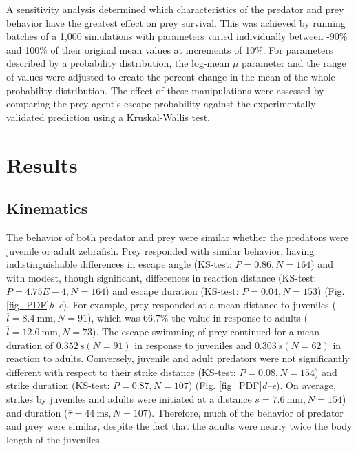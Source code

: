 \documentclass[]{rsos}%
\begin{document}
A sensitivity analysis determined which characteristics of the predator and prey behavior have the greatest effect on prey survival. 
This was achieved by running batches of a 1,000 simulations with parameters varied individually between -90\% and 100\% of their original mean values at increments of 10\%.
For parameters described by a probability distribution, the log-mean $\mu$ parameter and the range of values were adjusted to create the percent change in the mean of the whole probability distribution.
The effect of these manipulations were assessed by comparing the prey agent's escape probability against the experimentally-validated prediction using a Kruskal-Wallis test. 



\section{Results} %

\subsection{Kinematics} %
The behavior of both predator and prey were similar whether the predators were juvenile or adult zebrafish.
Prey responded with similar behavior, having indistinguishable differences in escape angle (KS-test: $P = 0.86, N = 164$) and with modest, though significant, differences in reaction distance (KS-test: $P = 4.75E-4, N = 164$) and escape duration (KS-test: $P = 0.04, N = 153$) (Fig. \ref{fig_PDF}\textit{b--c}). 
For example, prey responded at a mean distance to juveniles ($\overline{l} = \SI{8.4}{\mm}, N = 91$), which was 66.7\% the value in response to adults ($\overline{l} = \SI{12.6}{\mm}, N = 73$).
The escape swimming of prey continued for a mean duration of $\SI{0.352}{\s} (N = 91)$ in response to juveniles and $\SI{0.303}{\s} (N = 62)$ in reaction to adults.
Conversely, juvenile and adult predators were not significantly different with respect to their strike distance (KS-test: $P = 0.08, N = 154$) and strike duration (KS-test: $P = 0.87, N = 107$) (Fig. \ref{fig_PDF}\textit{d--e}).
On average, strikes by juveniles and adults were initiated at a distance $\overline{s} = \SI{7.6}{\mm}, N = 154$) and 
duration ($\overline{\tau} = \SI{44}{\ms}, N = 107$).
Therefore, much of the behavior of predator and prey were similar, despite the fact that the adults were nearly twice the body length of the juveniles.
\end{document}
